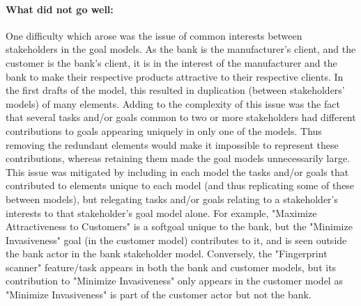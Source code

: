 \documentclass[10pt,fleqn]{article}
\begin{document}
\paragraph{What did not go well:}
	One difficulty which arose was the issue of common interests between
	stakeholders in the goal models. As the bank is the manufacturer's client,
	and the customer is the bank's client, it is in the interest of the
	manufacturer and the bank to make their respective products attractive to
	their respective clients. In the first drafts of the model, this resulted
	in duplication (between stakeholders' models) of many elements. Adding to
	the complexity of this issue was the fact that several tasks and/or goals
	common to two or more stakeholders had different contributions to goals
	appearing uniquely in only one of the models. Thus removing the redundant
	elements would make it impossible to represent these contributions, whereas
	retaining them made the goal models unnecessarily large. This issue was
	mitigated by including in each model the tasks and/or goals that contributed
	to elements unique to each model (and thus replicating some of these between
	models), but relegating tasks and/or goals relating to a stakeholder's
	interests to that stakeholder's goal model alone. For example, "Maximize
	Attractiveness to Customers" is a
	softgoal unique to the bank, but the "Minimize Invasiveness" goal (in the
	customer model) contributes to it, and is seen outside the bank actor in
	the bank stakeholder model. Conversely, the "Fingerprint scanner"
	feature/task appears in both the bank and customer models, but its
	contribution to "Minimize Invasiveness" only appears in the customer model
	as "Minimize Invasiveness" is part of the customer actor but not the bank.
\end{document}
